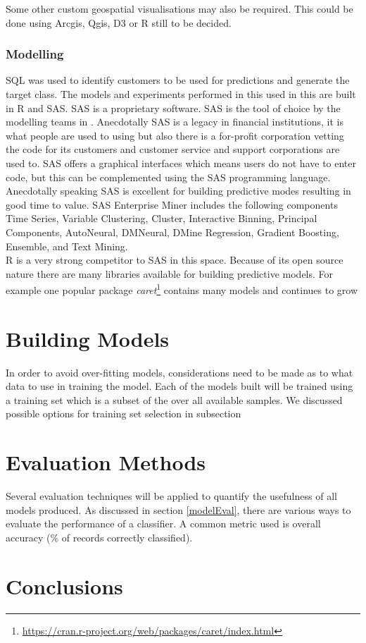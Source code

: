 Some other custom geospatial visualisations may also be required. This could be done using Arcgis, Qgis, D3 or R still to be decided.

\subsubsection{Modelling}
SQL was used to identify customers to be used for predictions and generate the target class.
The models and experiments performed in this used in this are built in R and SAS. SAS is a proprietary software. SAS is the tool of choice by the modelling teams in \subjectname. Anecdotally SAS is a legacy in financial institutions, it is what people are used to using but also there is a for-profit corporation vetting the code for its customers and customer service and support corporations are used to. SAS offers a graphical interfaces which means users do not have to enter code, but this can be complemented using the SAS programming language. Anecdotally speaking SAS is excellent for building predictive modes resulting in good time to value. SAS Enterprise Miner includes the following components Time Series, Variable Clustering, Cluster, Interactive Binning, Principal Components, AutoNeural, DMNeural, DMine Regression, Gradient Boosting, Ensemble, and Text Mining.
\\
R is a very strong competitor to SAS in this space. Because of its open source nature there are many libraries available for building predictive models. For example one popular package \textit{caret}\footnote{{\url{https://cran.r-project.org/web/packages/caret/index.html}}} contains many models and continues to grow

\section{Building Models}
In order to avoid over-fitting models, considerations need to be made as to what data to use in training the model. Each of the models built will be trained using a training set which is a subset of the over all available samples. We discussed possible options for training set selection in subsection


\section{Evaluation Methods}
Several evaluation techniques will be applied to quantify the usefulness of all models produced. As discussed in section \ref{modelEval}, there are various ways to evaluate the performance of a classifier. A common metric used is overall accuracy (\% of records correctly classified). 


\section{Conclusions}\label{desConc}
\begin{comment}
This chapter has discussed the processes required to carry out data mining techniques on non-relational web log data. The required data transformations have been discussed as well as the implemented methods for feature generation.
\end{comment}